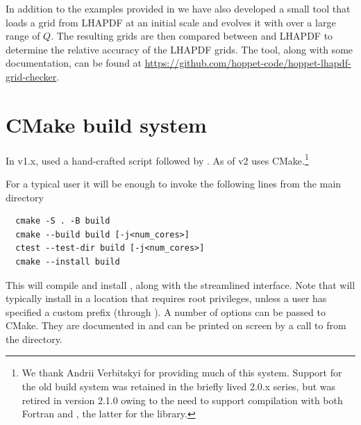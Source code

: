 In addition to the examples provided in
 we have also developed a small
tool that loads a grid from LHAPDF at an initial scale and evolves it
with \hoppet{} over a large range of $Q$. The resulting grids are then
compared between \hoppet{} and LHAPDF to determine the relative
accuracy of the LHAPDF grids. The tool, along with some documentation,
can be found at
\url{https://github.com/hoppet-code/hoppet-lhapdf-grid-checker}.

\section{CMake build system}
\label{sec:cmake}

In v1.x, \hoppet used a hand-crafted  script followed
by .
%
%
As of v2
% 
\hoppet uses CMake.\footnote{We thank Andrii Verbitskyi
  for providing much of this system.
  Support for the old build system was retained in the briefly lived
  2.0.x series, but was retired in version 2.1.0 owing to the need to
  support compilation with both Fortran and \CPP, the latter for the
   library.}

For a typical user it will be enough to invoke the following lines
from the main directory 
\begin{lstlisting}
  cmake -S . -B build
  cmake --build build [-j<num_cores>]
  ctest --test-dir build [-j<num_cores>]
  cmake --install build
\end{lstlisting}
% 
% 
This will compile and install \hoppet, along with the streamlined interface.
%
Note that  will typically
install in a location that requires root privileges, unless a user has
specified a custom prefix (through
). A number of options can
be passed to CMake. They are documented in
 and can be printed on screen
by a call to  from the  directory.

